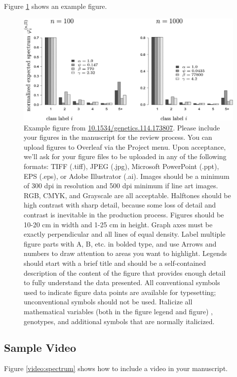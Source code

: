 \documentclass[9pt,twocolumn,twoside]{gsajnl}
\begin{document}
Figure \ref{fig:spectrum} shows an example figure.

\begin{figure}[htbp]
\centering
\includegraphics[width=\linewidth]{example-figure}
\caption{Example figure from \url{10.1534/genetics.114.173807}. Please include your figures in the manuscript for the review process. You can upload figures to Overleaf via the Project menu. Upon acceptance, we'll ask for your figure files to be uploaded in any of the following formats: TIFF (.tiff), JPEG (.jpg), Microsoft PowerPoint (.ppt), EPS (.eps), or Adobe Illustrator (.ai).  Images should be a minimum of 300 dpi in resolution and 500 dpi minimum if line art images.  RGB, CMYK, and Grayscale are all acceptable. Halftones should be high contrast with sharp detail, because some loss of detail and contrast is inevitable in the production process. Figures should be 10-20 cm in width and 1-25 cm in height. Graph axes must be exactly perpendicular and all lines of equal density.
Label multiple figure parts with A, B, etc. in bolded type, and use Arrows and numbers to draw attention to areas you want to highlight. Legends should start with a brief title and should be a self-contained description of the content of the figure that provides enough detail to fully understand the data presented. All conventional symbols used to indicate figure data points are available for typesetting; unconventional symbols should not be used. Italicize all mathematical variables (both in the figure legend and figure) , genotypes, and additional symbols that are normally italicized.  
}%
\label{fig:spectrum}
\end{figure}

\subsection*{Sample Video}

Figure \ref{video:spectrum} shows how to include a video in your manuscript.
\end{document}
